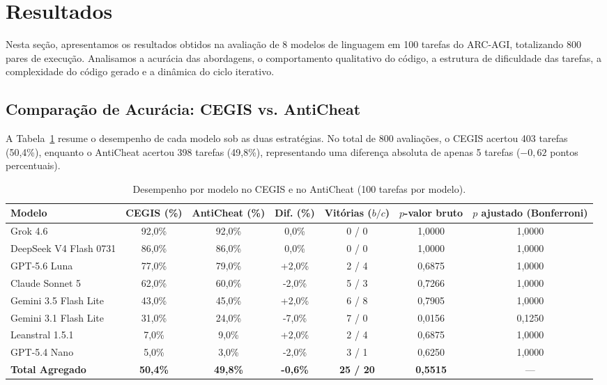 \section{Resultados}
\label{sec:resultados}

Nesta se\c{c}\~{a}o, apresentamos os resultados obtidos na avalia\c{c}\~{a}o de 8 modelos de linguagem em 100 tarefas do ARC-AGI, totalizando 800 pares de execu\c{c}\~{a}o. Analisamos a acur\'{a}cia das abordagens, o comportamento qualitativo do c\'{o}digo, a estrutura de dificuldade das tarefas, a complexidade do c\'{o}digo gerado e a din\^{a}mica do ciclo iterativo.

\subsection{Compara\c{c}\~{a}o de Acur\'{a}cia: CEGIS vs. AntiCheat}

A Tabela~\ref{tab:modelos} resume o desempenho de cada modelo sob as duas estrat\'{e}gias. No total de 800 avalia\c{c}\~{o}es, o CEGIS acertou 403 tarefas (50,4\%), enquanto o AntiCheat acertou 398 tarefas (49,8\%), representando uma diferen\c{c}a absoluta de apenas 5 tarefas ($-0,62$ pontos percentuais).

\begin{table}[h!]
\centering
\caption{Desempenho por modelo no CEGIS e no AntiCheat (100 tarefas por modelo).}
\label{tab:modelos}
\small
\begin{tabular}{lcccccc}
\toprule
\textbf{Modelo} & \textbf{CEGIS (\%)} & \textbf{AntiCheat (\%)} & \textbf{Dif. (\%)} & \textbf{Vit\'{o}rias ($b / c$)} & \textbf{$p$-valor bruto} & \textbf{$p$ ajustado (Bonferroni)} \\
\midrule
Grok 4.6 & 92,0\% & 92,0\% & 0,0\% & 0 / 0 & 1,0000 & 1,0000 \\
DeepSeek V4 Flash 0731 & 86,0\% & 86,0\% & 0,0\% & 0 / 0 & 1,0000 & 1,0000 \\
GPT-5.6 Luna & 77,0\% & 79,0\% & +2,0\% & 2 / 4 & 0,6875 & 1,0000 \\
Claude Sonnet 5 & 62,0\% & 60,0\% & -2,0\% & 5 / 3 & 0,7266 & 1,0000 \\
Gemini 3.5 Flash Lite & 43,0\% & 45,0\% & +2,0\% & 6 / 8 & 0,7905 & 1,0000 \\
Gemini 3.1 Flash Lite & 31,0\% & 24,0\% & -7,0\% & 7 / 0 & 0,0156 & 0,1250 \\
Leanstral 1.5.1 & 7,0\% & 9,0\% & +2,0\% & 2 / 4 & 0,6875 & 1,0000 \\
GPT-5.4 Nano & 5,0\% & 3,0\% & -2,0\% & 3 / 1 & 0,6250 & 1,0000 \\
\midrule
\textbf{Total Agregado} & \textbf{50,4\%} & \textbf{49,8\%} & \textbf{-0,6\%} & \textbf{25 / 20} & \textbf{0,5515} & --- \\
\bottomrule
\end{tabular}
\end{table}

